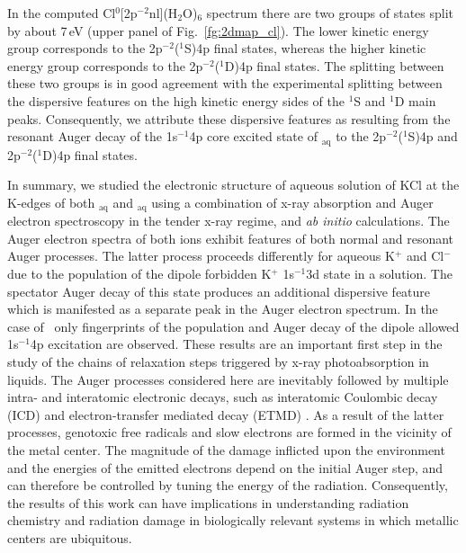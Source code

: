 In the computed Cl$^{0}$[2p$^{-2}$nl](H$_2$O)$_6$ spectrum there are two groups of states split by about 7\,eV (upper panel of Fig.\ \ref{fg:2dmap_cl}). The lower kinetic energy group corresponds to the 2p$^{-2}$($^1$S)4p final states, whereas the higher kinetic energy group corresponds to the 2p$^{-2}$($^1$D)4p final states. The splitting between these two groups is in good agreement with the experimental splitting between the dispersive features on the high kinetic energy sides of the $^1$S and $^1$D main peaks. Consequently, we attribute these dispersive features as resulting from the resonant Auger decay of the 1s$^{-1}$4p core excited state of \cli$_{\text{aq}}$ to the 2p$^{-2}$($^1$S)4p and  2p$^{-2}$($^1$D)4p final states.


In summary, we studied the electronic structure of aqueous solution of KCl at the K-edges of both \ki$_{\text{aq}}$ and \cli$_{\text{aq}}$ using a combination of x-ray absorption and Auger electron spectroscopy in the tender x-ray regime, and {\it ab initio} calculations. The Auger electron spectra of both ions exhibit features of both normal and resonant Auger processes. The latter process proceeds differently for aqueous K$^{+}$ and Cl$^{-}$ due to the population of the dipole forbidden K$^{+}$ 1s$^{-1}$3d state in a solution. The spectator Auger decay of this state produces an additional dispersive feature which is manifested as a separate peak in the Auger electron spectrum. In the case of \cli~only fingerprints of the population and Auger decay of the dipole allowed 1s$^{-1}$4p excitation are observed. These results are an important first step in the study of the chains of relaxation steps triggered by x-ray photoabsorption in liquids. The Auger processes considered here are inevitably followed by multiple intra- and interatomic electronic decays, such as interatomic Coulombic decay (ICD) and electron-transfer mediated decay (ETMD) \citep{unger17:708,Stumpf16:237}. As a result of the latter processes, genotoxic free radicals and slow electrons are formed in the vicinity of the metal center. The magnitude of the damage inflicted upon the environment and the energies of the emitted electrons depend on the initial Auger step, and can therefore be controlled by tuning the energy of the radiation. Consequently, the results of this work can have implications in understanding radiation chemistry and radiation damage in biologically relevant systems in which metallic centers are ubiquitous.